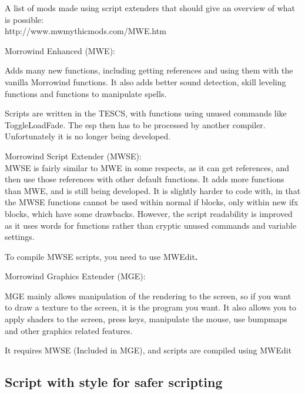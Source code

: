 A list of mods made using script extenders that should give an overview
of what is possible:\\
http://www.mwmythicmods.com/MWE.htm

Morrowind Enhanced (MWE):

Adds many new functions, including getting references and using them
with the vanilla Morrowind functions. It also adds better sound
detection, skill leveling functions and functions to manipulate spells.

Scripts are written in the TESCS, with functions using unused commands
like ToggleLoadFade. The esp then has to be processed by another
compiler.\\
Unfortunately it is no longer being developed.

Morrowind Script Extender (MWSE):\\

MWSE is fairly similar to MWE in some respects, as it can get
references, and then use those references with other default functions.
It adds more functions than MWE, and is still being developed. It is
slightly harder to code with, in that the MWSE functions cannot be used
within normal if blocks, only within new ifx blocks, which have some
drawbacks. However, the script readability is improved as it uses words
for functions rather than cryptic unused commands and variable settings.

To compile MWSE scripts, you need to use MWEdit\textbf{.}

Morrowind Graphics Extender (MGE):

MGE mainly allows manipulation of the rendering to the screen, so if you
want to draw a texture to the screen, it is the program you want. It
also allows you to apply shaders to the screen, press keys, manipulate
the mouse, use bumpmaps and other graphics related features.

It requires MWSE (Included in MGE), and scripts are compiled using
MWEdit

\hypertarget{script-with-style-for-safer-scripting}{%
\subsection{Script with style for safer
scripting}\label{script-with-style-for-safer-scripting}}

